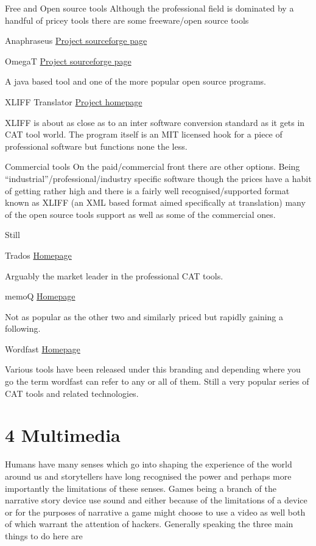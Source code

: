 \documentclass[
]{book}
\begin{document}
Free and Open source tools Although the professional field is dominated by a handful of pricey tools there are some freeware/open source tools

Anaphraseus \href{http://sourceforge.net/projects/anaphraseus/?source=recommended}{Project sourceforge page}

OmegaT \href{http://sourceforge.net/projects/omegat/?source=recommended}{Project sourceforge page}

A java based tool and one of the more popular open source programs.

XLIFF Translator \href{http://felix-cat.com/tools/xliff-translator/}{Project homepage}

XLIFF is about as close as to an inter software conversion standard as it gets in CAT tool world. The program itself is an MIT licensed hook for a piece of professional software but functions none the less.

Commercial tools On the paid/commercial front there are other options. Being ``industrial''/professional/industry specific software though the prices have a habit of getting rather high and there is a fairly well recognised/supported format known as XLIFF (an XML based format aimed specifically at translation) many of the open source tools support as well as some of the commercial ones.

Still

Trados \href{http://www.trados.com/en/freelance-translators/default.asp}{Homepage}

Arguably the market leader in the professional CAT tools.

memoQ \href{http://kilgray.com/products/memoq}{Homepage}

Not as popular as the other two and similarly priced but rapidly gaining a following.

Wordfast \href{http://www.wordfast.net/}{Homepage}

Various tools have been released under this branding and depending where you go the term wordfast can refer to any or all of them. Still a very popular series of CAT tools and related technologies.

\hypertarget{multimedia}{%
\chapter{4 Multimedia}\label{multimedia}}

Humans have many senses which go into shaping the experience of the world around us and storytellers have long recognised the power and perhaps more importantly the limitations of these senses. Games being a branch of the narrative story device use sound and either because of the limitations of a device or for the purposes of narrative a game might choose to use a video as well both of which warrant the attention of hackers. Generally speaking the three main things to do here are
\end{document}
